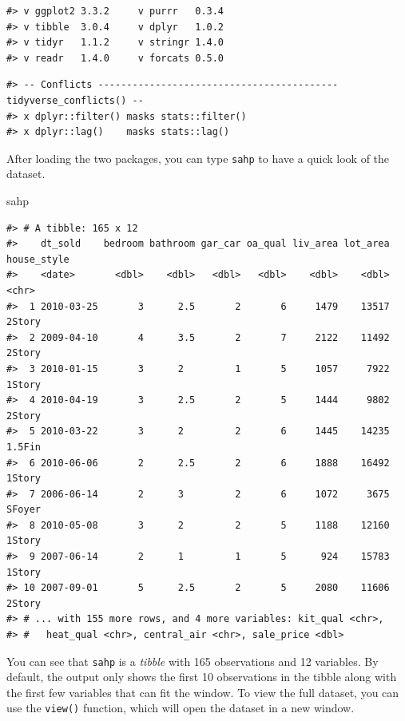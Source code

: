 \documentclass[
]{book}
\newenvironment{Shaded}{\begin{snugshade}}{\end{snugshade}}
\newcommand{\NormalTok}[1]{#1}
\begin{document}
\begin{verbatim}
#> v ggplot2 3.3.2     v purrr   0.3.4
#> v tibble  3.0.4     v dplyr   1.0.2
#> v tidyr   1.1.2     v stringr 1.4.0
#> v readr   1.4.0     v forcats 0.5.0
\end{verbatim}

\begin{verbatim}
#> -- Conflicts ------------------------------------------ tidyverse_conflicts() --
#> x dplyr::filter() masks stats::filter()
#> x dplyr::lag()    masks stats::lag()
\end{verbatim}

After loading the two packages, you can type \texttt{sahp} to have a quick look of the dataset.

\begin{Shaded}
\begin{Highlighting}[]
\NormalTok{sahp}
\end{Highlighting}
\end{Shaded}

\begin{verbatim}
#> # A tibble: 165 x 12
#>    dt_sold    bedroom bathroom gar_car oa_qual liv_area lot_area house_style
#>    <date>       <dbl>    <dbl>   <dbl>   <dbl>    <dbl>    <dbl> <chr>      
#>  1 2010-03-25       3      2.5       2       6     1479    13517 2Story     
#>  2 2009-04-10       4      3.5       2       7     2122    11492 2Story     
#>  3 2010-01-15       3      2         1       5     1057     7922 1Story     
#>  4 2010-04-19       3      2.5       2       5     1444     9802 2Story     
#>  5 2010-03-22       3      2         2       6     1445    14235 1.5Fin     
#>  6 2010-06-06       2      2.5       2       6     1888    16492 1Story     
#>  7 2006-06-14       2      3         2       6     1072     3675 SFoyer     
#>  8 2010-05-08       3      2         2       5     1188    12160 1Story     
#>  9 2007-06-14       2      1         1       5      924    15783 1Story     
#> 10 2007-09-01       5      2.5       2       5     2080    11606 2Story     
#> # ... with 155 more rows, and 4 more variables: kit_qual <chr>,
#> #   heat_qual <chr>, central_air <chr>, sale_price <dbl>
\end{verbatim}

You can see that \texttt{sahp} is a \emph{tibble} with 165 observations and 12 variables. By default, the output only shows the first 10 observations in the tibble along with the first few variables that can fit the window. To view the full dataset, you can use the \texttt{view()} function, which will open the dataset in a new window.
\end{document}
